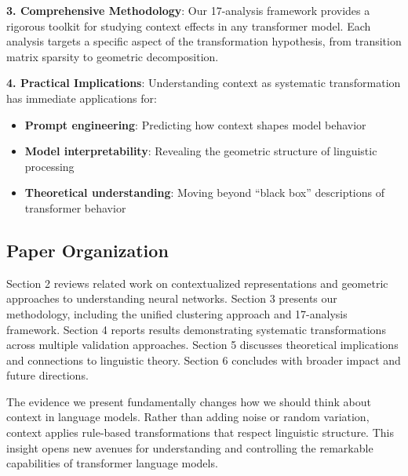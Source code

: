 \textbf{3. Comprehensive Methodology}: Our 17-analysis framework provides a rigorous toolkit for studying context effects in any transformer model. Each analysis targets a specific aspect of the transformation hypothesis, from transition matrix sparsity to geometric decomposition.

\textbf{4. Practical Implications}: Understanding context as systematic transformation has immediate applications for:
\begin{itemize}
    \item \textbf{Prompt engineering}: Predicting how context shapes model behavior
    \item \textbf{Model interpretability}: Revealing the geometric structure of linguistic processing  
    \item \textbf{Theoretical understanding}: Moving beyond ``black box'' descriptions of transformer behavior
\end{itemize}

\subsection{Paper Organization}

Section 2 reviews related work on contextualized representations and geometric approaches to understanding neural networks. Section 3 presents our methodology, including the unified clustering approach and 17-analysis framework. Section 4 reports results demonstrating systematic transformations across multiple validation approaches. Section 5 discusses theoretical implications and connections to linguistic theory. Section 6 concludes with broader impact and future directions.

The evidence we present fundamentally changes how we should think about context in language models. Rather than adding noise or random variation, context applies rule-based transformations that respect linguistic structure. This insight opens new avenues for understanding and controlling the remarkable capabilities of transformer language models.